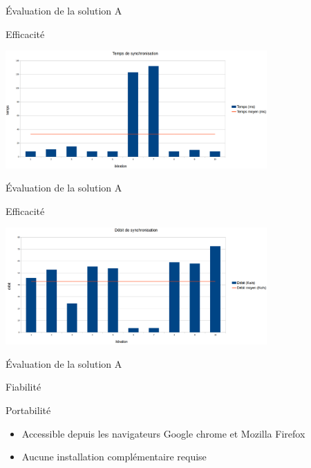 \author{Jérémy \textsc{Guillon}}
\begin{frame}{\'Evaluation de la solution A}
\begin{block}{Efficacité}
 \begin{center}
  \includegraphics[width=10cm]{images/tempsA.png}
 \end{center}
\end{block}
\end{frame}

\begin{frame}{\'Evaluation de la solution A}
\begin{block}{Efficacité}
 \begin{center}
  \includegraphics[width=10cm]{images/debitA.png}
 \end{center}
\end{block}
\end{frame}

\begin{frame}{\'Evaluation de la solution A}
\begin{block}{Fiabilité}

\end{block}
\begin{block}{Portabilité}
  \begin{itemize}
   \item Accessible depuis les navigateurs Google chrome et Mozilla Firefox
   \item Aucune installation complémentaire requise
  \end{itemize}
\end{block}
\end{frame}
